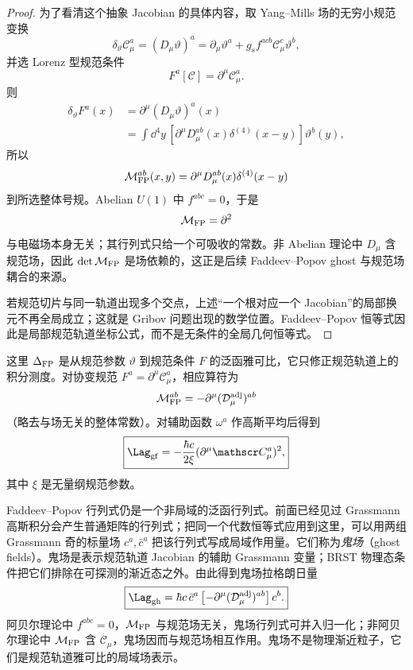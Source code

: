 \begin{proof}
为了看清这个抽象 Jacobian 的具体内容，取 Yang--Mills 场的无穷小规范变换
\[
\delta_\vartheta \mathscr C_\mu^a
=
(D_\mu\vartheta)^a
=
\partial_\mu\vartheta^a
+g_s f^{acb}\mathscr C_\mu^c\vartheta^b,
\]
并选 Lorenz 型规范条件
\[
F^a[\mathscr C]
=
\partial^\mu\mathscr C_\mu^a.
\]
则
\begin{align*}
\delta_\vartheta F^a(x)
&=
\partial^\mu
(D_\mu\vartheta)^a(x)\\
&=
\int\dd^4 y\,
\left[
\partial^\mu D_\mu^{ab}(x)
\delta^{(4)}(x-y)
\right]
\vartheta^b(y),
\end{align*}
所以
\[
\mathcal M_{\rm FP}^{ab}(x,y)
=
\partial^\mu D_\mu^{ab}(x)
\delta^{(4)}(x-y)
\]
到所选整体号规。Abelian \(U(1)\) 中 \(f^{abc}=0\)，于是
\[
\mathcal M_{\rm FP}
=
\partial^2
\]
与电磁场本身无关；其行列式只给一个可吸收的常数。非 Abelian 理论中 \(D_\mu\) 含规范场，因此
\(\det\mathcal M_{\rm FP}\) 是场依赖的，这正是后续 Faddeev--Popov ghost 与规范场耦合的来源。

若规范切片与同一轨道出现多个交点，上述“一个根对应一个 Jacobian”的局部换元不再全局成立；这就是 Gribov 问题出现的数学位置。Faddeev--Popov 恒等式因此是局部规范轨道坐标公式，而不是无条件的全局几何恒等式。
\end{proof}

这里 $\Delta_{\rm FP}$ 是从规范参数 $\vartheta$ 到规范条件 $F$ 的泛函雅可比，它只修正规范轨道上的积分测度。对协变规范 $F^a=\partial^\mu\mathscr C_\mu^a$，相应算符为
\begin{equation*}
 \mathcal M_{\rm FP}^{ab}
 =-\partial^\mu(\mathcal D_\mu^{\rm adj})^{ab}
\end{equation*}
（略去与场无关的整体常数）。对辅助函数 $\omega^a$ 作高斯平均后得到
\begin{equation}
 \boxed{
 \Lag_{\rm gf}
 =-\frac{\hbar c}{2\xi}
 (\partial^\mu\mathscr C_\mu^a)^2,}
 \label{eq:general-covariant-gf-dp11}
\end{equation}
其中 $\xi$ 是无量纲规范参数。

Faddeev--Popov 行列式仍是一个非局域的泛函行列式。前面已经见过 Grassmann 高斯积分会产生普通矩阵的行列式；把同一个代数恒等式应用到这里，可以用两组 Grassmann 奇的标量场 $c^a,\bar c^a$ 把该行列式写成局域作用量。它们称为\emph{鬼场}（ghost fields）。鬼场是表示规范轨道 Jacobian 的辅助 Grassmann 变量；BRST 物理态条件把它们排除在可探测的渐近态之外。由此得到鬼场拉格朗日量
\begin{equation}
 \boxed{
 \Lag_{\rm gh}
 =\hbar c\,\bar c^a
 \left[-\partial^\mu(\mathcal D_\mu^{\rm adj})^{ab}\right]c^b.}
 \label{eq:general-ghost-lagrangian-dp11}
\end{equation}
阿贝尔理论中 $f^{abc}=0$，$\mathcal M_{\rm FP}$ 与规范场无关，鬼场行列式可并入归一化；非阿贝尔理论中 $\mathcal M_{\rm FP}$ 含 $\mathscr C_\mu$，鬼场因而与规范场相互作用。鬼场不是物理渐近粒子，它们是规范轨道雅可比的局域场表示。

